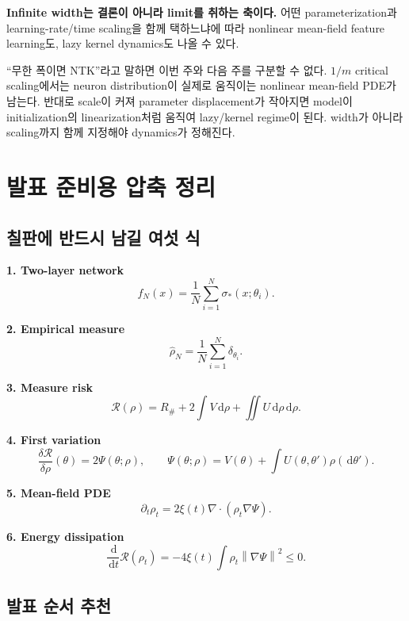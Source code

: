 \documentclass[11pt,a4paper,oneside,openany]{memoir}
\newcommand{\Risk}{\mathcal{R}}
\newcommand{\grad}{\nabla}
\newcommand{\dd}{\,\mathrm{d}}
\newcommand{\diver}{\nabla\!\cdot}
\newcommand{\norm}[1]{\left\lVert #1\right\rVert}
\theoremstyle{definition}
\begin{document}
\begin{keybox}
\textbf{Infinite width는 결론이 아니라 limit를 취하는 축이다.}
어떤 parameterization과 learning-rate/time scaling을 함께 택하느냐에 따라
nonlinear mean-field feature learning도, lazy kernel dynamics도 나올 수 있다.
\end{keybox}

\begin{presentbox}
``무한 폭이면 NTK''라고 말하면 이번 주와 다음 주를 구분할 수 없다.
$1/m$ critical scaling에서는 neuron distribution이 실제로 움직이는 nonlinear mean-field PDE가 남는다.
반대로 scale이 커져 parameter displacement가 작아지면 model이 initialization의 linearization처럼 움직여
lazy/kernel regime이 된다. width가 아니라 scaling까지 함께 지정해야 dynamics가 정해진다.
\end{presentbox}

\chapter{발표 준비용 압축 정리}

\section{칠판에 반드시 남길 여섯 식}

\textbf{1. Two-layer network}
\[
  f_N(x)=\frac1N\sum_{i=1}^N\sigma_*(x;\theta_i).
\]

\textbf{2. Empirical measure}
\[
  \hat\rho_N=\frac1N\sum_{i=1}^N\delta_{\theta_i}.
\]

\textbf{3. Measure risk}
\[
\Risk(\rho)
=R_\#+2\int V\dd\rho+\iint U\dd\rho\dd\rho.
\]

\textbf{4. First variation}
\[
  \frac{\delta\Risk}{\delta\rho}(\theta)=2\Psi(\theta;\rho),
  \qquad
  \Psi(\theta;\rho)=V(\theta)+\int U(\theta,\theta')\rho(\dd\theta').
\]

\textbf{5. Mean-field PDE}
\[
  \partial_t\rho_t
  =2\xi(t)\diver(\rho_t\grad\Psi).
\]

\textbf{6. Energy dissipation}
\[
  \frac{\dd}{\dd t}\Risk(\rho_t)
  =-4\xi(t)\int\rho_t\norm{\grad\Psi}^2\le0.
\]

\section{발표 순서 추천}
\end{document}
